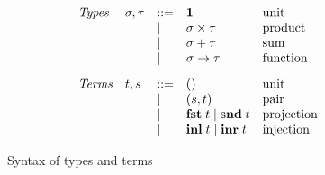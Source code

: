 \begin{figure}[H]
  \small
  \[
  \begin{array}{lllll}
    \textit{Types} &
    \sigma, \tau
    & ::= &
    \mathbf{1}
    &
    \text{unit}
    \\
    && \mid &
    \sigma \times \tau
    &
    \text{product}
    \\
    && \mid &
    \sigma + \tau
    &
    \text{sum}
    \\
    && \mid &
    \sigma \to \tau
    &
    \text{function}
    \\[3mm]
    \textit{Terms} &
    t, s
    & ::= &
    ()
    &
    \text{unit}
    \\
    && \mid &
    (s,t)
    &
    \text{pair}
    \\
    && \mid &
    \mathbf{fst}\;t \mid \mathbf{snd}\;t
    &
    \text{projection}
    \\
    && \mid &
    \mathbf{inl}\;t \mid \mathbf{inr}\;t
    &
    \text{injection}
    \\
  \end{array}
  \]
  \caption{Syntax of types and terms }
\end{figure}
